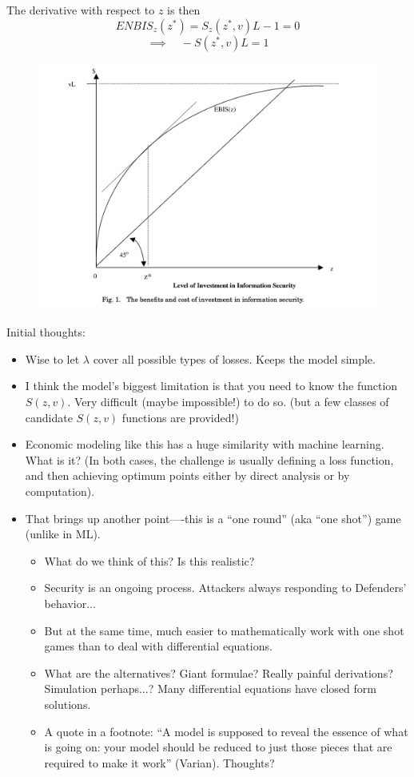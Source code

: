 \documentclass[11pt]{article}
\begin{document}
The derivative with respect to $z$ is then 
$$ ENBIS_z(z^*) = S_z(z^*,v)L - 1 = 0$$
$$ \implies \quad -S(z^*,v)L = 1$$

\begin{figure}[h]
    \centering
    \includegraphics*[width=4.5in]{fig1.png}
    \label{fig:fig1}
\end{figure}
\FloatBarrier


Initial thoughts:
\begin{itemize}
    \item Wise to let $\lambda$ cover all possible types of losses. Keeps the model simple. 
    \item I think the model's biggest limitation is that  you need to know the function $S(z,v)$. Very difficult (maybe impossible!) to do so. (but a few classes of candidate $S(z,v)$ functions are provided!)
    \item Economic modeling like this has a huge similarity with machine learning. What is it? (In both cases, the challenge is usually defining a loss function, and then achieving optimum points either by direct analysis or by computation).
    \item That brings up another point----this is a ``one round'' (aka ``one shot'') game (unlike in ML). 
    \begin{itemize}
        \item What do we think of this? Is this realistic?
        \item Security is an ongoing process. Attackers always responding to Defenders' behavior...
        \item But at the same time, much easier to mathematically work with one shot games than to deal with differential equations.
        \item What are the alternatives? Giant formulae? Really painful derivations? Simulation perhaps...? Many differential equations have closed form solutions.
        \item A quote in a footnote: ``A model is supposed to reveal the essence of what is going on: your model should be reduced to just those pieces that are required to make it work'' (Varian). Thoughts?
    \end{itemize}
\end{itemize}
\end{document}
